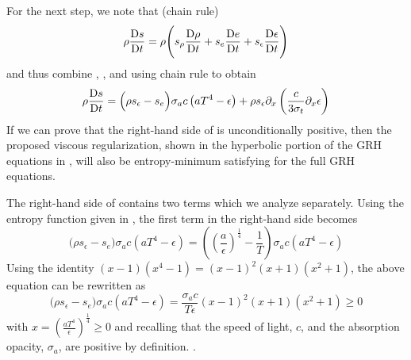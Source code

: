 \documentclass[times,doublespace]{fldauth}%
\begin{document}
\noindent
For the next step, we note that (chain rule)
%
\begin{equation}
\rho \frac{\textrm{D} s}{\textrm{D} t} = \rho \Bigg( s_\rho \frac{\textrm{D} \rho}{\textrm{D} t} + s_e \frac{\textrm{D} e}{\textrm{D} t} +s_\epsilon \frac{\textrm{D} \epsilon}{\textrm{D} t} \Bigg)
\end{equation}
%
and thus combine , , and  using chain rule to obtain
%
\begin{equation} \label{eq:entro_eq_all_terms}
\rho \frac{\textrm{D} s}{\textrm{D} t} = \Big( \rho s_\epsilon -s_e \Big)  \sigma_a c \left( a T^4 - \epsilon \right) +   \rho s_\epsilon \partial_x \left( \frac{c}{3 \sigma_t} \partial_x \epsilon \right) 
\end{equation}
%
If we can prove that the right-hand side of  is unconditionally positive, then the proposed 
viscous regularization, shown in the hyperbolic portion of the GRH equations in , 
will also be entropy-minimum satisfying for the full GRH equations. 

The right-hand side of  contains two terms which we analyze separately. 
Using the entropy function given in , the first term in the right-hand side becomes
%
\begin{equation} 
\Big( \rho s_\epsilon -s_e \Big)  \sigma_a c \left( a T^4 - \epsilon \right) 
= \left( \left( \frac{a}{\epsilon}\right)^\frac{1}{4} - \frac{1}{T} \right)   \sigma_a c \left( a T^4 - \epsilon \right) 
\end{equation}
Using the identity $(x-1)(x^4-1) = (x-1)^2(x+1)(x^2+1)$, the above equation can be rewritten as
\begin{equation} 
\Big( \rho s_\epsilon -s_e \Big)  \sigma_a c \left( a T^4 - \epsilon \right) 
= \frac{\sigma_a c}{T \epsilon}  (x-1)^2(x+1)(x^2+1) \geq 0
\end{equation}
%
with $x=  \left(\frac{aT^4}{\epsilon}\right)^\frac{1}{4} \geq 0$ and recalling that the speed of light, $c$,
and the absorption opacity, $\sigma_a$, are positive by definition. .
\end{document}
